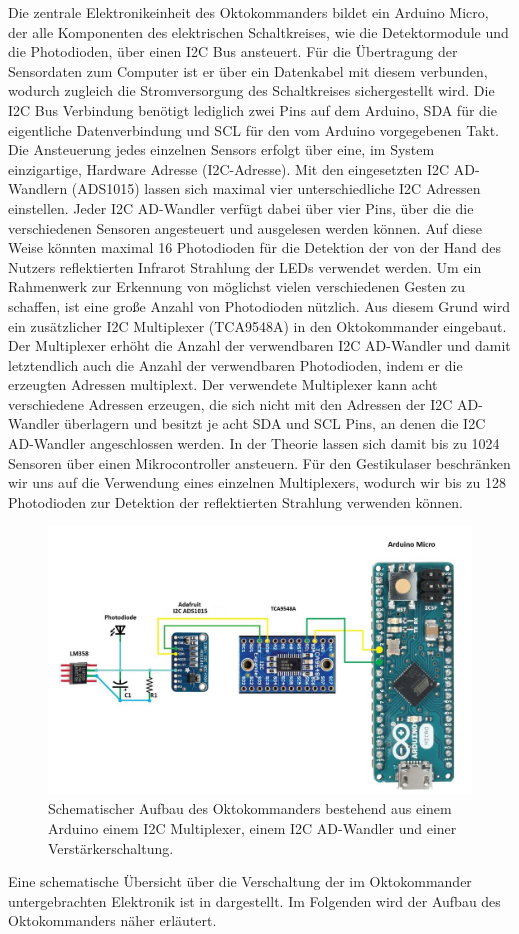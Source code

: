 Die zentrale Elektronikeinheit des Oktokommanders bildet ein Arduino Micro, der alle Komponenten des elektrischen Schaltkreises, wie die Detektormodule und die Photodioden, über einen I2C Bus ansteuert. Für die Übertragung der Sensordaten zum Computer ist er über ein Datenkabel mit diesem verbunden, wodurch zugleich die Stromversorgung des Schaltkreises sichergestellt wird. Die I2C Bus Verbindung benötigt lediglich zwei Pins auf dem Arduino, SDA für die eigentliche Datenverbindung und SCL für den vom Arduino vorgegebenen Takt. Die Ansteuerung jedes einzelnen Sensors erfolgt über eine, im System einzigartige, Hardware Adresse (I2C-Adresse). Mit den eingesetzten I2C AD-Wandlern (ADS1015) lassen sich maximal vier unterschiedliche I2C Adressen einstellen. Jeder I2C AD-Wandler verfügt dabei über vier Pins, über die die verschiedenen Sensoren angesteuert und ausgelesen werden können. Auf diese Weise könnten maximal 16 Photodioden für die Detektion der von der Hand des Nutzers reflektierten Infrarot Strahlung der LEDs verwendet werden. Um ein Rahmenwerk zur Erkennung von möglichst vielen verschiedenen Gesten zu schaffen, ist eine große Anzahl von Photodioden nützlich. Aus diesem Grund wird ein zusätzlicher I2C Multiplexer (TCA9548A) in den Oktokommander eingebaut. Der Multiplexer erhöht die Anzahl der verwendbaren I2C AD-Wandler und damit letztendlich auch die Anzahl der verwendbaren Photodioden, indem er die erzeugten Adressen multiplext. Der verwendete Multiplexer kann acht verschiedene Adressen erzeugen, die sich nicht mit den Adressen der I2C AD-Wandler überlagern und besitzt je acht SDA und SCL Pins, an denen die I2C AD-Wandler angeschlossen werden. In der Theorie lassen sich damit bis zu 1024 Sensoren über einen Mikrocontroller ansteuern. Für den Gestikulaser beschränken wir uns auf die Verwendung eines einzelnen Multiplexers, wodurch wir bis zu 128 Photodioden zur Detektion der reflektierten Strahlung verwenden können. 
\begin{figure}[H]
	\centering
	\includegraphics[scale=0.5]{../figures/oktokommander2.jpg}
	\caption{Schematischer Aufbau des Oktokommanders bestehend aus einem Arduino einem I2C Multiplexer, einem I2C AD-Wandler und einer Verstärkerschaltung.}
	\label{fig:SchaltungOktokommander}
\end{figure}
\noindent
Eine schematische Übersicht über die Verschaltung der im Oktokommander untergebrachten Elektronik ist in  dargestellt. Im Folgenden wird der Aufbau des Oktokommanders näher erläutert.


